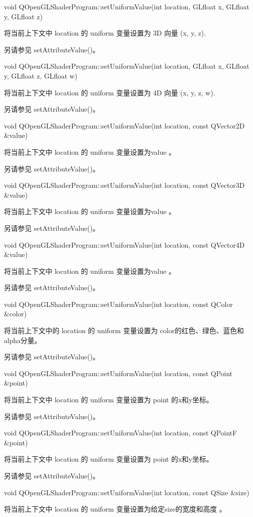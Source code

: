 void QOpenGLShaderProgram::setUniformValue(int location, GLfloat x, GLfloat y, GLfloat z)

将当前上下文中 location 的 uniform 变量设置为 3D 向量 (x, y, z).

另请参见 setAttributeValue()。

void QOpenGLShaderProgram::setUniformValue(int location, GLfloat x, GLfloat y, GLfloat z, GLfloat w)

将当前上下文中 location 的 uniform 变量设置为 4D 向量 (x, y, z, w).

另请参见 setAttributeValue()。

void QOpenGLShaderProgram::setUniformValue(int location, const QVector2D \&value)

将当前上下文中 location 的 uniform 变量设置为value 。

另请参见 setAttributeValue()。

void QOpenGLShaderProgram::setUniformValue(int location, const QVector3D \&value)

将当前上下文中 location 的 uniform 变量设置为value 。

另请参见 setAttributeValue()。

void QOpenGLShaderProgram::setUniformValue(int location, const QVector4D \&value)

将当前上下文中 location 的 uniform 变量设置为value 。

另请参见 setAttributeValue()。

void QOpenGLShaderProgram::setUniformValue(int location, const QColor \&color)

将当前上下文中的 location 的 uniform 变量设置为 color的红色、绿色、蓝色和alpha分量。

另请参见 setAttributeValue()。

void QOpenGLShaderProgram::setUniformValue(int location, const QPoint \&point)

将当前上下文中 location 的 uniform 变量设置为 point 的x和y坐标。

另请参见 setAttributeValue()。

void QOpenGLShaderProgram::setUniformValue(int location, const QPointF \&point)


将当前上下文中 location 的 uniform 变量设置为 point 的x和y坐标。

另请参见 setAttributeValue()。

void QOpenGLShaderProgram::setUniformValue(int location, const QSize \&size)

将当前上下文中 location 的 uniform 变量设置为给定size的宽度和高度 。

